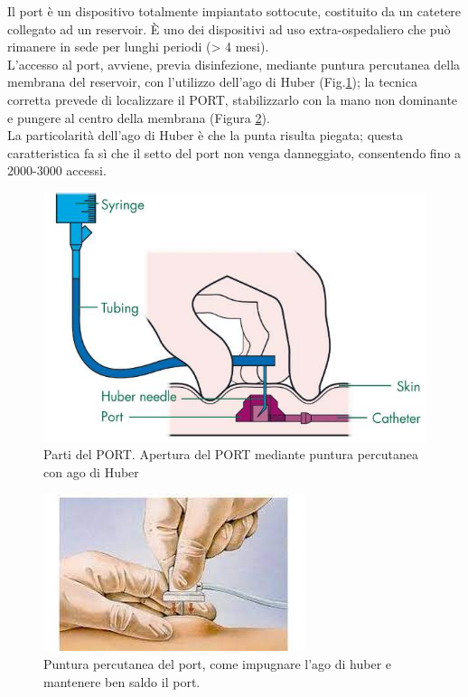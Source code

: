 Il port è un dispositivo totalmente impiantato sottocute, costituito da un catetere collegato ad un reservoir\cite{AIOMCVC}.
È uno dei dispositivi ad uso extra-ospedaliero che può rimanere in sede per lunghi periodi (> 4 mesi)\cite{GAVECELTracc2021}.\\
L'accesso al port, avviene, previa disinfezione, mediante puntura percutanea della membrana del reservoir, con 
l'utilizzo dell'ago di Huber (Fig.\ref{fig:FIGURE_4.6}); la tecnica corretta prevede di localizzare il PORT,
stabilizzarlo con la mano non dominante e pungere al centro della membrana (Figura \ref{fig:FIGURE_4.7}).\\
La particolarità dell'ago di Huber è che la punta risulta piegata; questa caratteristica fa sì che il 
setto del port non venga danneggiato, consentendo fino a 2000-3000 accessi\cite{AIOMCVC}.

\begin{figure}[H]
    \begin{center}
    \includegraphics[width=0.4\columnwidth]{img/port-a-cath-picc.jpeg}
    \vspace{-3mm}
    \end{center}
    \caption{Parti del PORT. Apertura del PORT mediante puntura percutanea con ago di Huber
    \cite{img43}}
    \label{fig:FIGURE_4.6}
\end{figure}

\begin{figure}[H]
    \begin{center}
    \includegraphics[width=0.4\columnwidth]{img/port2.jpeg}
    \vspace{-3mm}
    \end{center}
    \caption{Puntura percutanea del port, come impugnare l’ago di huber e mantenere ben saldo il port.
    \cite{img44}}
    \label{fig:FIGURE_4.7}
\end{figure}

